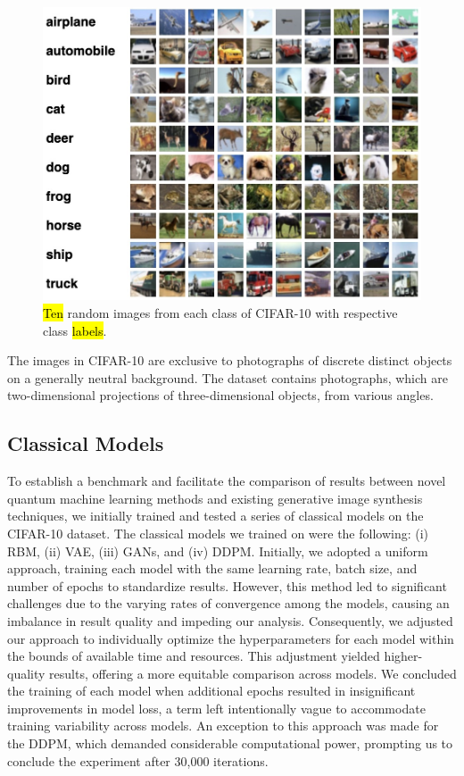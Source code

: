 \documentclass[technologies,article,accept,pdftex,moreauthors]{Definitions/mdpi}
\begin{document}
\begin{figure}[H]
    \includegraphics[width=.9\columnwidth]{cifar10.jpeg}
    \caption{\label{fig:cifar10}\hl{Ten} %
 random images from each class of CIFAR-10 with respective class \hl{labels}.}
\end{figure}


The images in CIFAR-10 are exclusive to photographs of discrete distinct objects on a generally neutral background. The dataset contains photographs, which are two-dimensional projections of three-dimensional objects, from various angles.


\subsection{Classical Models}

To establish a benchmark and facilitate the comparison of results between novel quantum machine learning methods and existing generative image synthesis techniques, we initially trained and tested a series of classical models on the CIFAR-10 dataset. The classical models we trained on were the following: (i) RBM, (ii) VAE, (iii) GANs, and (iv) DDPM. Initially, we adopted a uniform approach, training each model with the same learning rate, batch size, and number of epochs to standardize results. However, this method led to significant challenges due to the varying rates of convergence among the models, causing an imbalance in result quality and impeding our analysis. Consequently, we adjusted our approach to individually optimize the hyperparameters for each model within the bounds of available time and resources. This adjustment yielded higher-quality results, offering a more equitable comparison across models. We concluded the training of each model when additional epochs resulted in insignificant improvements in model loss, a term left intentionally vague to accommodate training variability across models. An exception to this approach was made for the DDPM, which demanded considerable computational power, prompting us to conclude the experiment after 30,000 iterations.
\end{document}
